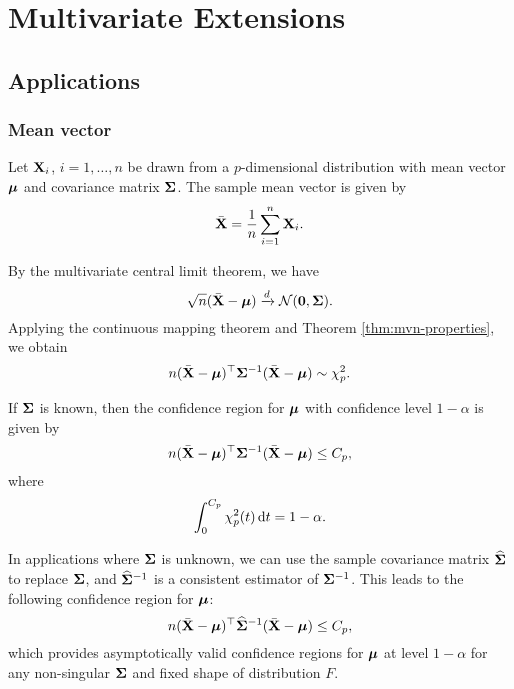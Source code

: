 \chapter{Multivariate Extensions}

\section{Applications}

\subsection{Mean vector}

Let ${\bf X}_{i}$, $i=1,\ldots,n$ be drawn from a $p$-dimensional distribution with mean vector $\boldsymbol{\mu}$ and covariance matrix $\boldsymbol{\Sigma}$. The sample mean vector is given by
\begin{equation*}
	\bar{{\bf X}}=\frac{1}{n}\sum_{i=1}^{n}{\bf X}_{i}.
\end{equation*}

By the multivariate central limit theorem, we have
\begin{equation*}
	\sqrt{n}(\bar{{\bf X}}-\boldsymbol{\mu})\xrightarrow{d}{\mathcal N}(\mathbf{0},\boldsymbol{\Sigma}).
\end{equation*}
Applying the continuous mapping theorem and Theorem \ref{thm:mvn-properties}, we obtain
\begin{equation*}
	n(\bar{{\bf X}}-\boldsymbol{\mu})^{\top}\boldsymbol{\Sigma}^{-1}(\bar{{\bf X}}-\boldsymbol{\mu})\sim\chi^{2}_{p}.
\end{equation*}

If $\boldsymbol{\Sigma}$ is known, then the confidence region for $\boldsymbol{\mu}$ with confidence level $1-\alpha$ is given by
\begin{equation*}
	n(\bar{{\bf X}}-\boldsymbol{\mu})^{\top}\boldsymbol{\Sigma}^{-1}(\bar{{\bf X}}-\boldsymbol{\mu})\leq C_{p},
\end{equation*}
where
\begin{equation*}
	\int_{0}^{C_{p}}\chi^{2}_{p}(t)\mathop{}\!\mathrm{d} t=1-\alpha.
\end{equation*}

In applications where $\boldsymbol{\Sigma}$ is unknown, we can use the sample covariance matrix $\widehat{\boldsymbol{\Sigma}}$ to replace $\boldsymbol{\Sigma}$, and $\widehat{\boldsymbol{\Sigma}}^{-1}$ is a consistent estimator of $\boldsymbol{\Sigma}^{-1}$. This leads to the following confidence region for $\boldsymbol{\mu}$:
\begin{equation*}
	n(\bar{{\bf X}}-\boldsymbol{\mu})^{\top}\widehat{\boldsymbol{\Sigma}}^{-1}(\bar{{\bf X}}-\boldsymbol{\mu})\leq C_{p},
\end{equation*}
which provides asymptotically valid confidence regions for $\boldsymbol{\mu}$ at level $1-\alpha$ for any non-singular $\boldsymbol{\Sigma}$ and fixed shape of distribution $F$.

